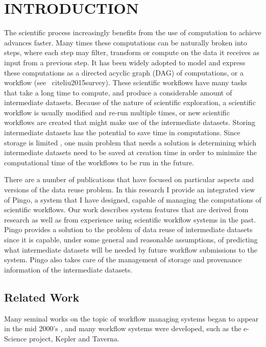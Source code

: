 \chapter{INTRODUCTION}
\label{chap:introduction}
The scientific process increasingly benefits from the use of computation to achieve advances faster. Many times these computations can be naturally broken into steps, where each step may filter, transform or compute on the data it receives as input from a previous step.  It has been widely adopted to model and express these computations as a directed acyclic graph (DAG) of computations, or a workflow (see \
cite{liu2015survey}).  These scientific workflows have many tasks that take a long time to compute, and produce a considerable amount of intermediate datasets.  Because of the nature of scientific exploration, a scientific workflow is usually modified and re-run multiple times, or new scientific workflows are created that might make use of the intermediate datasets.  Storing intermediate datasets has the potential to save time in computations. Since storage is limited , one main problem that needs a solution is determining which intermediate datasets need to be saved at creation time in order to minimize the computational time of the workflows to be run in the future.

There are a number of publications that have focused on particular aspects and versions of the data reuse problem.  In this research I provide an integrated view of Pingo, a system that I have designed, capable of managing the computations of scientific workflows. Our work describes system features that are derived from research as well as from experience using scientific workflow systems in the past. Pingo provides a solution to the problem of data reuse of intermediate datasets since it is capable, under some general and reasonable assumptions, of predicting what intermediate datasets will be needed by future workflow submissions to the system. Pingo also takes care of the management of storage and provenance information of the intermediate datasets.

\section{Related Work}
Many seminal works on the topic of workflow managing systems began to appear in the mid 2000's \citep[e.g.]{yu2005taxonomy, fox2006special, gil2007examining}, and many workflow systems were developed, such as the e-Science project\citep{deelman2009workflows}, Kepler\cite{altintas2004kepler} and Taverna\cite{oinn2006taverna}.  

